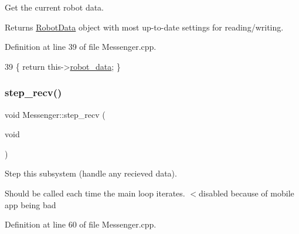 Get the current robot data. 

\begin{DoxyReturn}{Returns}
\hyperlink{class_robot_data}{Robot\+Data} object with most up-\/to-\/date settings for reading/writing. 
\end{DoxyReturn}


Definition at line 39 of file Messenger.\+cpp.


\begin{DoxyCode}
39 \{ \textcolor{keywordflow}{return} this->\hyperlink{class_messenger_aaeacb9e9c4aad3b1be628df9ec71c11c}{robot\_data}; \}
\end{DoxyCode}
\mbox{\label{class_messenger_abdf16b0ba616983f4c4b1895ed937eb2}} 
\subsubsection{\texorpdfstring{step\+\_\+recv()}{step\_recv()}}
{\footnotesize\ttfamily void Messenger\+::step\+\_\+recv (\begin{DoxyParamCaption}\item[{void}]{ }\end{DoxyParamCaption})}



Step this subsystem (handle any recieved data). 

Should be called each time the main loop iterates. $<$disabled because of mobile app being bad 

Definition at line 60 of file Messenger.\+cpp.


